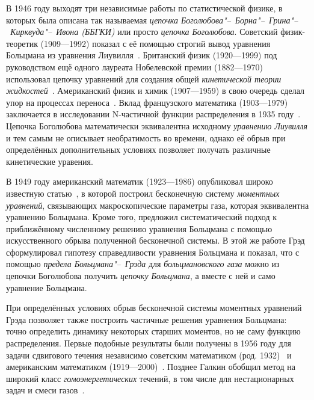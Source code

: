 \documentclass[a4paper, 12pt, oneside]{article} %
\begin{document}
В 1946 году выходят три независимые работы по статистической физике, в
которых была описана так называемая \emph{цепочка
Боголюбова"--~Борна"--~Грина"--~Кирквуда"--~Ивона (ББГКИ)} или просто
\emph{цепочка Боголюбова}. Советский физик-теоретик  (1909---1992) показал с её помощью строгий вывод уравнения
Больцмана из уравнения Лиувилля~\cite{bogolyubov1946kinetic}. Британский
физик  (1920---1999) под руководством ещё одного
лауреата Нобелевской премии  (1882---1970)
использовал цепочку уравнений для создания общей \emph{кинетической
теории жидкостей}~\cite{born1946general}. Американский физик и химик
 (1907---1959) в свою очередь сделал упор на
процессах переноса~\cite{kirkwood1946statistical}. Вклад французского
математика  (1903---1979) заключается в исследовании
N-частичной функции распределения в 1935 году~\cite{yvon1935theorie}.
Цепочка Боголюбова математически эквивалентна исходному \emph{уравнению
Лиувилля} и тем самым не описывает необратимость во времени, однако её
обрыв при определённых дополнительных условиях позволяет получать
различные кинетические уравения.

В 1949 году американский математик  (1923---1986)
опубликовал широко известную статью~\cite{grad1949kinetic}, в которой
построил бесконечную систему \emph{моментных уравнений}, связывающих
макроскопические параметры газа, которая эквивалентна уравнению
Больцмана. Кроме того, предложил систематический подход к приближённому
численному решению уравнения Больцмана с помощью искусственного обрыва
полученной бесконечной системы. В этой же работе Грэд сформулировал
гипотезу справедливости уравнения Больцмана и показал, что с помощью
\emph{предела Больцмана"--~Грэда} для \emph{больцмановского газа} можно
из цепочки Боголюбова получить \emph{цепочку Больцмана}, а вместе с ней
и само уравнение Больцмана.

При определённых условиях обрыв бесконечной системы моментных уравнений
Грэда позволяет также построить частичные решения уравнения Больцмана:
точно определить динамику некоторых старших моментов, но не саму функцию
распределения. Первые подобные результаты были получены в 1956 году для задачи
сдвигового течения независимо советским математиком  (род. 1932)~\cite{galkin1956solution} и американским
математиком 
(1919---2000)~\cite{truesdell1956pressures}. Позднее Галкин обобщил
метод на широкий класс \emph{гомоэнергетических} течений, в том числе
для нестационарных задач и смеси газов~\cite{galkin1956solutions}.
\end{document}
